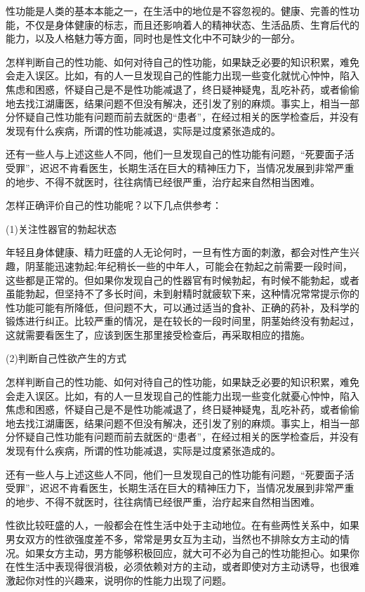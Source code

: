 \documentclass[12pt,UTF8]{ctexbook}
\begin{document}
性功能是人类的基本本能之一，在生活中的地位是不容忽视的。健康、完善的性功能，不仅是身体健康的标志，而且还影响着人的精神状态、生活品质、生育后代的能力，以及人格魅力等方面，同时也是性文化中不可缺少的一部分。

怎样判断自己的性功能、如何对待自己的性功能，如果缺乏必要的知识积累，难免会走入误区。比如，有的人一旦发现自己的性能力出现一些变化就忧心忡忡，陷入焦虑和困惑，怀疑自己是不是性功能减退了，终日疑神疑鬼，乱吃补药，或者偷偷地去找江湖庸医，结果问题不但没有解决，还引发了别的麻烦。事实上，相当一部分怀疑自己性功能有问题而前去就医的“患者”，在经过相关的医学检查后，并没有发现有什么疾病，所谓的性功能减退，实际是过度紧张造成的。

还有一些人与上述这些人不同，他们一旦发现自己的性功能有问题，“死要面子活受罪”，迟迟不肯看医生，长期生活在巨大的精神压力下，当情况发展到非常严重的地步、不得不就医时，往往病情已经很严重，治疗起来自然相当困难。

怎样正确评价自己的性功能呢？以下几点供参考：

(1)关注性器官的勃起状态

年轻且身体健康、精力旺盛的人无论何时，一旦有性方面的刺激，都会对性产生兴趣，阴茎能迅速勃起;年纪稍长一些的中年人，可能会在勃起之前需要一段时间，这些都是正常的。但如果你发现自己的性器官有时候勃起，有时候不能勃起，或者虽能勃起，但坚持不了多长时间，未到射精时就疲软下来，这种情况常常提示你的性功能可能有所降低，但问题不大，可以通过适当的食补、正确的药补，及科学的锻炼进行纠正。比较严重的情况，是在较长的一段时间里，阴茎始终没有勃起过，这就需要看医生了，应该到医生那里接受检查后，再采取相应的措施。

(2)判断自己性欲产生的方式

怎样判断自己的性功能、如何对待自己的性功能，如果缺乏必要的知识积累，难免会走入误区。比如，有的人一旦发现自己的性能力出现一些变化就憂心忡忡，陷入焦虑和困惑，怀疑自己是不是性功能减退了，终日疑神疑鬼，乱吃补药，或者偷偷地去找江湖庸医，结果问题不但没有解决，还引发了别的麻烦。事实上，相当一部分怀疑自己性功能有问题而前去就医的“患者”，在经过相关的医学检查后，并没有发现有什么疾病，所谓的性功能减退，实际是过度紧张造成的。

还有一些人与上述这些人不同，他们一旦发现自己的性功能有问题，“死要面子活受罪”，迟迟不肯看医生，长期生活在巨大的精神压力下，当情况发展到非常严重的地步、不得不就医时，往往病情已经很严重，治疗起来自然相当困难。

性欲比较旺盛的人，一般都会在性生活中处于主动地位。在有些两性关系中，如果男女双方的性欲强度差不多，常常是男女互为主动，当然也不排除女方主动的情况。如果女方主动，男方能够积极回应，就大可不必为自己的性功能担心。如果你在性生活中表现得很消极，必须依赖对方的主动，或者即使对方主动诱导，也很难激起你对性的兴趣来，说明你的性能力出现了问题。
\end{document}
